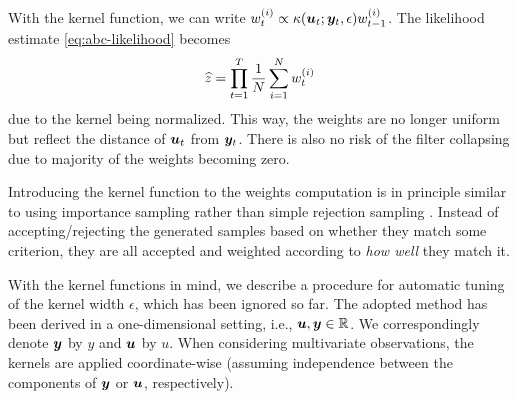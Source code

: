 With the kernel function, we can write $w_t^{(i)} \propto \kappa(\bm{u}_t; \bm{y}_t, \epsilon) w_{t-1}^{(i)}$. The likelihood estimate \eqref{eq:abc-likelihood} becomes
\begin{equation} \label{eq:abc-likelihood-kernel}
\widehat{z} = \prod_{t=1}^T \frac{1}{N} \sum_{i=1}^N w_t^{(i)}
\end{equation}
due to the kernel being normalized. This way, the weights are no longer uniform but reflect the distance of $\bm{u}_t$ from $\bm{y}_t$. There is also no risk of the filter collapsing due to majority of the weights becoming zero.

Introducing the kernel function to the weights computation is in principle similar to using importance sampling rather than simple rejection sampling \citep{information-theory}. Instead of accepting/rejecting the generated samples based on whether they match some criterion, they are all accepted and weighted according to \emph{how well} they match it.

With the kernel functions in mind, we describe a procedure for automatic tuning of the kernel width $\epsilon$, which has been ignored so far. The adopted method has been derived in a one-dimensional setting, i.e., $\bm{u}, \bm{y} \in \mathbb{R}$. We correspondingly denote $\bm{y}$ by $y$ and $\bm{u}$ by $u$. When considering multivariate observations, the kernels are applied coordinate-wise (assuming independence between the components of $\bm{y}$ or $\bm{u}$, respectively).


